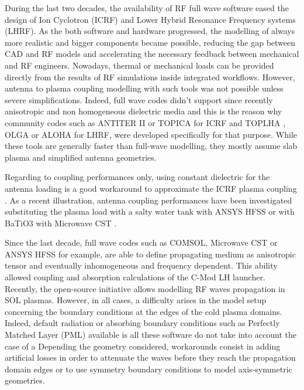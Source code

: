 \documentclass[preprint,3p,twocolumn]{elsarticle}
\begin{document}
During the last two decades, the availability of RF full wave software eased the design of Ion Cyclotron ({ICRF}) and Lower Hybrid Resonance Frequency systems ({LHRF}). As the both software and hardware progressed, the modelling of always more realistic and bigger components became possible, reducing the gap between CAD and RF models and accelerating the necessary feedback between mechanical and RF engineers. Nowadays, thermal or mechanical loads can be provided directly from the results of RF simulations inside integrated workflows. However, antenna to plasma coupling modelling with such tools was not possible unless severe simplifications. Indeed, full wave codes didn't support since recently anisotropic and non homogeneous dielectric media and this is the reason why community codes such as {ANTITER II} \cite{Messiaen2011} or {TOPICA} \cite{Lancellotti2006} for {ICRF} and {TOPLHA} \cite{Milanesio2012}, {OLGA} \cite{Preinhaelter2017} or {ALOHA} \cite{Hillairet2010a} for LHRF, were developed specifically for that purpose. While these tools are generally faster than full-wave modelling, they mostly assume slab plasma and simplified antenna geometries. %


Regarding to coupling performances only, using constant dielectric for the antenna loading is a good workaround to approximate the ICRF plasma coupling \cite{Messiaen2011a}. 
As a recent illustration, antenna coupling performances have been investigated substituting the plasma load  with a salty water tank with ANSYS HFSS \cite{Ravera2012} or with BaTiO3 with Microwave CST \cite{Bottollier-Curtet2011}. %



Since the last decade, full wave codes such as {COMSOL}, Microwave {CST} or {ANSYS} {HFSS} for example, are able to define propagating medium as anisotropic tensor and eventually inhomogeneous and frequency dependent. 
This ability allowed coupling\cite{Meneghini2009g, Shiraiwa2009} and absorption\cite{Meneghini2009} calculations of the C-Mod LH launcher. Recently, the open-source initiative \cite{Shiraiwa2017} allows modelling RF waves propagation in SOL plasmas. However, in all cases, a difficulty arises in the model setup concerning the boundary conditions at the edges of the cold plasma domains. Indeed, default radiation or absorbing boundary conditions such as Perfectly Matched Layer (PML) available is all these software do not take into account the case of a \cite{Jacquot2013b}
Depending the geometry considered, workarounds consist in adding artificial losses in order to attenuate the waves before they reach the propagation domain edges\cite{bibid} or to use symmetry boundary conditions to model axis-symmetric geometries.   
\end{document}
